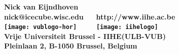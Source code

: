 \documentclass[a4paper,landscape,pdftex]{article}
\author{Nick van Eijndhoven}
\date{Vrije Universiteit Brussel (VUB)}
\begin{document}
\begin{titlepage}
\begin{center}
\vspace*{-4cm}
{\LARGE \bf
 Nick van Eijndhoven\\[1mm]
 nick@icecube.wisc.edu $\quad$ http://www.iihe.ac.be\\[1cm]
 \texttt{[image: vublogo-hor]} $\qquad$
 \texttt{[image: iihelogo]}\\[3mm]
 Vrije Universiteit Brussel - IIHE(ULB-VUB)\\[1mm]
 Pleinlaan 2, B-1050 Brussel, Belgium
}
\end{center}
\end{titlepage}

\twocolumn








\end{document}

